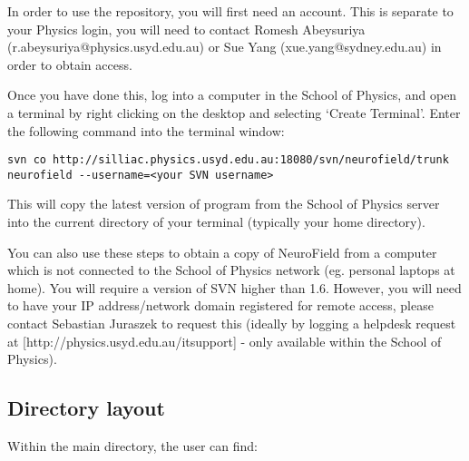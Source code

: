 \documentclass[12pt,a4paper]{article}
\begin{document}
In order to use the repository, you will first need an account. This is separate to your Physics login, you will need to contact Romesh Abeysuriya (r.abeysuriya@physics.usyd.edu.au) or Sue Yang (xue.yang@sydney.edu.au) in order to obtain access. 

Once you have done this, log into a computer in the School of Physics, and open a terminal by right clicking on the desktop and selecting `Create Terminal'. Enter the following command into the terminal window:
	
	\begin{lstlisting}
svn co http://silliac.physics.usyd.edu.au:18080/svn/neurofield/trunk neurofield --username=<your SVN username>
	\end{lstlisting}


This will copy the latest version of program from the School of Physics server into the current directory of your terminal (typically your home directory).

You can also use these steps to obtain a copy of NeuroField from a computer which is not connected to the School of Physics network (eg. personal laptops at home). You will require a version of SVN higher than 1.6. However, you will need to have your IP address/network domain registered for remote access, please contact Sebastian Juraszek to request this (ideally by logging a helpdesk request at [http://physics.usyd.edu.au/itsupport] - only available within the School of Physics). 

\subsection{Directory layout}
Within the main directory, the user can find:
\end{document}

